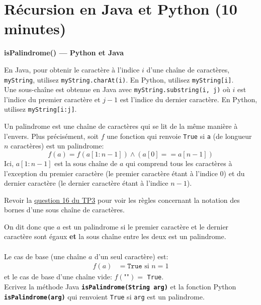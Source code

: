 \section{Récursion en Java et Python (10 minutes)}
\begin{Exercice}[10 minutes] \textbf{isPalindrome() — Python et Java}
    \begin{conseil}
        En Java, pour obtenir le caractère à l'indice $i$ d'une chaîne de caractères, \texttt{myString}, utilisez \texttt{myString.charAt(i)}. En Python, utilisez \texttt{myString[i]}. \\
        
        Une sous-chaîne est obtenue en Java avec \texttt{myString.substring(i, j)} où $i$ est l'indice du premier caractère et $j-1$ est l'indice du dernier caractère. En Python, utilisez \texttt{myString[i:j]}.
    \end{conseil}
      Un palindrome est une chaîne de caractères qui se lit de la même manière à l'envers. Plus précisément, soit $f$ une fonction qui renvoie \texttt{True} si \texttt{a} (de longueur $n$ caractères) est un palindrome: \\
\begin{equation}
    f(a) = f(a[1:n-1])\wedge (a[0] == a[n-1])
\end{equation}
Ici, $a[1:n-1]$ est la sous chaîne de $a$ qui comprend tous les caractères à l'exception du premier caractère (le premier caractère étant à l'indice 0) et du dernier caractère (le dernier caractère étant à l'indice $n-1$). 
\begin{conseil}
    Revoir la \href{https://moodle.unil.ch/mod/folder/view.php?id=1965123}{question 16 du TP3} pour voir les règles concernant la notation des bornes d'une sous chaîne de caractères. 
\end{conseil}
On dit donc que $a$ est un palindrome si le premier caractère et le dernier caractère sont égaux \textbf{et} la sous chaîne entre les deux est un palindrome. \\  \\

Le cas de base (une chaîne $a$ d'un seul caractère) est:
\begin{align*}
    f(a) &= \texttt{True} \text{ si } n=1 
\end{align*}
et le cas de base d'une chaîne vide: $f(\texttt{""}) =$ \texttt{True}.\\

Ecrivez la méthode Java \textbf{\texttt{isPalindrome(String arg)}}  et la fonction Python \textbf{\texttt{isPalindrome(arg)}} qui renvoient \texttt{True} si \texttt{arg} est un palindrome.

\begin{solution}[Java]

\end{solution}
\begin{solution}[Python]
    
\end{solution}

\end{Exercice}

